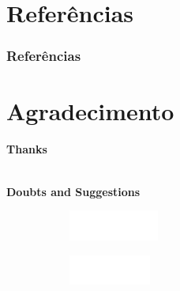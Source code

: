 \documentclass[aspectratio=169,t,xcolor=table]{beamer}
\begin{document}
\section[Referências]{Referências}
\begin{frame}[allowframebreaks]
   \frametitle<presentation>{Referências}
\justifying{

}
\end{frame}

\section{Agradecimento}
\begin{frame}
    \centering
    \vspace{2cm}
    
    \textbf{\Huge Thanks}%
    
    \ \\
    
    \textbf{Doubts and Suggestions}
    \ \\
    
    
    \vspace{2cm}
    \begin{figure}
        \centering
        \begin{subfigure}{0.2\textwidth}
            \centering
            \includegraphics[height=1cm]{lib/logos/infw.png}
        \end{subfigure}%
        \qquad 
        \begin{subfigure}{0.2\textwidth}
            \centering
            \includegraphics[height=1cm]{lib/logos/ufgw.png}
        \end{subfigure}
      
    \end{figure}
    
\end{frame}



\titlepage
\end{document}
